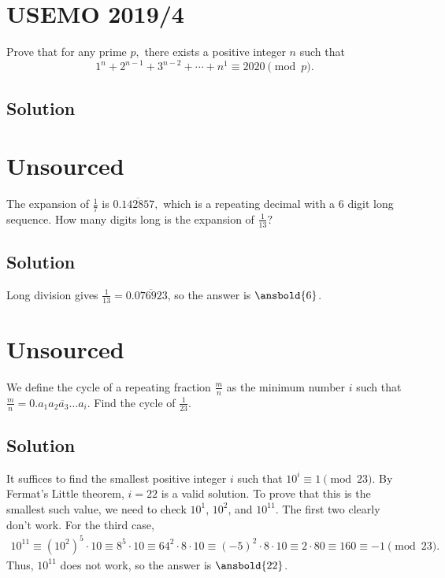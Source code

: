 \documentclass[mast]{lucky}
\begin{document}
\pagebreak\section{USEMO 2019/4}

Prove that for any prime $p,$ there exists a positive integer $n$ such that
\[1^n+2^{n-1}+3^{n-2}+\cdots+n^1\equiv 2020\pmod{p}.\]

\subsection{Solution}

\pagebreak\section{Unsourced}

The expansion of $\frac{1}{7}$ is $0.\overline{142857},$ which is a repeating decimal with a $6$ digit long sequence. How many digits long is the expansion of $\frac{1}{13}?$

\subsection{Solution}

Long division gives $\frac{1}{13} = 0.\overline{076923}$, so the answer is $\ansbold{6}$.

\pagebreak\section{Unsourced}

We define the cycle of a repeating fraction $\tfrac{m}{n}$ as the minimum number $i$ such that $\tfrac{m}{n} = 0.\overline{a_1a_2a_3\dots a_i}$. Find the cycle of $\tfrac{1}{23}$.

\subsection{Solution}

It suffices to find the smallest positive integer $i$ such that $10^i \equiv 1 \pmod{23}$. By Fermat's Little theorem, $i = 22$ is a valid solution. To prove that this is the smallest such value, we need to check $10^1$, $10^2$, and $10^{11}$. The first two clearly don't work. For the third case,
\begin{align*}
10^{11} \equiv (10^2)^5 \cdot 10 \equiv 8^5 \cdot 10 \equiv 64^2 \cdot 8 \cdot 10 \equiv (-5)^2 \cdot 8 \cdot 10 \equiv 2 \cdot 80 \equiv 160 \equiv -1 \pmod{23}.
\end{align*}
Thus, $10^{11}$ does not work, so the answer is $\ansbold{22}$.
\end{document}
